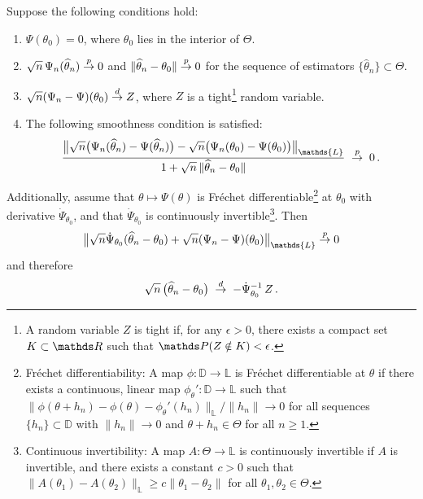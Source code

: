 	\begin{theorem}
		\label{thm:master}
		Suppose the following conditions hold:
		\begin{enumerate}
			\item $\Psi(\theta_0) = 0$, where $\theta_0$ lies in the interior of $\Theta$.
			\item $\sqrt{n} \, \Psi_n(\widehat{\theta}_n) \stackrel{p}{\rightarrow} 0$ and $\|\widehat{\theta}_n - \theta_0\| \stackrel{p}{\rightarrow} 0$ for the sequence of estimators $\{\widehat{\theta}_n\} \subset \Theta$.
			\item $\sqrt{n} (\Psi_n - \Psi)(\theta_0) \stackrel{d}{\rightarrow} Z$, where $Z$ is a tight\footnote{A random variable $Z$ is tight if, for any $\epsilon > 0$, there exists a compact set $K \subset \Real$ such that $\Prob(Z \notin K) < \epsilon$.} random variable.
			\item The following smoothness condition is satisfied:
			\begin{align}
				\label{eq:master_cond}
				\frac{\big\| \sqrt{n} \big(\Psi_n(\widehat{\theta}_n) - \Psi(\widehat{\theta}_n)\big) - \sqrt{n} \big(\Psi_n(\theta_0) - \Psi(\theta_0)\big) \big\|_{\mathds{L}}}{1 + \sqrt{n} \, \| \widehat{\theta}_n - \theta_0 \|} \; \convergep \; 0 \, .
			\end{align}
		\end{enumerate}
		
		Additionally, assume that $\theta \mapsto \Psi(\theta)$ is Fréchet differentiable\footnote{Fréchet differentiability: A map $\phi: \mathds{D} \to \mathds{L}$ is Fréchet differentiable at $\theta$ if there exists a continuous, linear map $\phi_{\theta}': \mathds{D} \to \mathds{L}$ such that
		${\| \phi(\theta + h_n) - \phi(\theta) - \phi_{\theta}'(h_n) \|_{\mathds{L}}}/{\|h_n\|} \rightarrow 0$
		for all sequences $\{h_n\} \subset \mathds{D}$ with $\|h_n\| \to 0$ and $\theta + h_n \in \Theta$ for all $n \geq 1$.} at $\theta_0$
		with derivative $\dot{\Psi}_{\theta_0}$, and that $\dot{\Psi}_{\theta_0}$ is continuously invertible\footnote{Continuous invertibility: A map $A: \Theta \to \mathds{L}$ is continuously invertible if $A$ is invertible, and there exists a constant $c > 0$ such that $\|A(\theta_1) - A(\theta_2)\|_{\mathds{L}} \geq c \|\theta_1 - \theta_2\|$ for all $\theta_1, \theta_2 \in \Theta$.}.
		Then
		\begin{align*}
			\big\| \sqrt{n} \dot{\Psi}_{\theta_0}(\widehat{\theta}_n - \theta_0) + \sqrt{n} (\Psi_n - \Psi)(\theta_0) \big\|_{\mathds{L}} \convergep 0
		\end{align*}
		and therefore
		\begin{align*}
			\sqrt{n} \, \big(\widehat{\theta}_n - \theta_0\big) \; \stackrel{d}{\rightarrow} \; - \dot{\Psi}_{\theta_0}^{-1} \, Z \, .
		\end{align*}
	\end{theorem}
	
	


	


	

